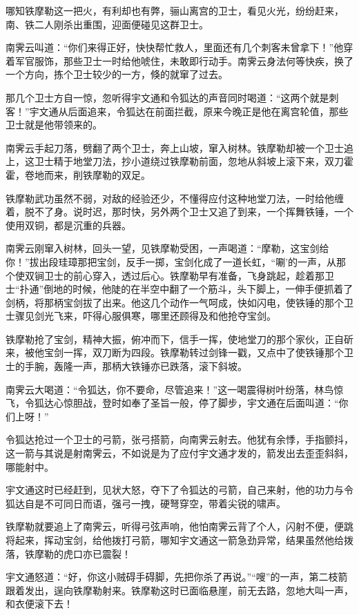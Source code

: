 \documentclass[12pt,oneside]{book}
\begin{document}
哪知铁摩勒这一把火，有利却也有弊，骊山离宫的卫士，看见火光，纷纷赶来，南、铁二人刚杀出重围，迎面便碰见这群卫士。

南霁云叫道：``你们来得正好，快快帮忙救人，里面还有几个刺客未曾拿下！''他穿着军官服饰，那些卫士一时给他唬住，未敢即行动手。南霁云身法何等快疾，换了一个方向，拣个卫士较少的一方，倏的就窜了过去。

那几个卫士方自一惊，忽听得宇文通和令狐达的声音同时喝道：``这两个就是刺客！''宇文通从后面追来，令狐达在前面拦截，原来今晚正是他在离宫轮值，那些卫士就是他带领来的。

南霁云手起刀落，劈翻了两个卫士，奔上山坡，窜入树林。铁摩勒却被一个卫士追上，这卫士精于地堂刀法，抄小道绕过铁摩勒前面，忽地从斜坡上滚下来，双刀霍霍，卷地而来，削铁摩勒的双足。

铁摩勒武功虽然不弱，对敌的经验还少，不懂得应付这种地堂刀法，一时给他缠着，脱不了身。说时迟，那时快，另外两个卫士又追了到来，一个挥舞铁锤，一个使用双铜，都是沉重的兵器。

南霁云刚窜入树林，回头一望，见铁摩勒受困，一声喝道：``摩勒，这宝剑给你！''拔出段珪璋那把宝剑，反手一掷，宝剑化成了一道长虹，``唰'的一声，从那个使双锏卫士的前心穿入，透过后心。铁摩勒早有准备，飞身跳起，趁着那卫士``扑通''倒地的时候，他陡的在半空中翻了一个筋斗，头下脚上，一伸手便抓着了剑柄，将那柄宝剑拔了出来。他这几个动作一气呵成，快如闪电，使铁锤的那个卫士骤见剑光飞来，吓得心服俱寒，哪里还顾得及和他抢夺宝剑。

铁摩勒抢了宝剑，精神大振，俯冲而下，信手一挥，使地堂刀的那个家伙，正自斫来，被他宝剑一挥，双刀断为四段。铁摩勒转过剑锋一戳，又点中了使铁锤那个卫士的手腕，轰隆一声，那柄大铁锤亦已跌落，滚下斜坡。

南霁云大喝道：``令狐达，你不要命，尽管追来！''这一喝震得树叶纷落，林鸟惊飞，令狐达心惊胆战，登时如奉了圣旨一般，停了脚步，宇文通在后面叫道：``你们上呀！''

令狐达抢过一个卫士的弓箭，张弓搭箭，向南霁云射去。他犹有余悸，手指颤抖，这一箭与其说是射南霁云，不如说是为了应付宇文通才发的，箭发出去歪歪斜斜，哪能射中。

宇文通这时已经赶到，见状大怒，夺下了令狐达的弓箭，自己来射，他的功力与令狐达自是不可同日而语，强弓一拽，硬弩穿空，带着尖锐的啸声。

铁摩勒就要追上了南霁云，听得弓弦声响，他怕南霁云背了个人，闪射不便，便跳将起来，挥动宝剑，给他拨打弓箭，哪知宇文通这一箭急劲异常，结果虽然他给拨落，铁摩勒的虎口亦已震裂！

宇文通怒道：``好，你这小贼碍手碍脚，先把你杀了再说。''``嗖''的一声，第二枝箭跟着发出，逞向铁摩勒射来。铁摩勒这时已面临悬崖，前无去路，忽地大叫一声，和衣便滚下去！
\end{document}
